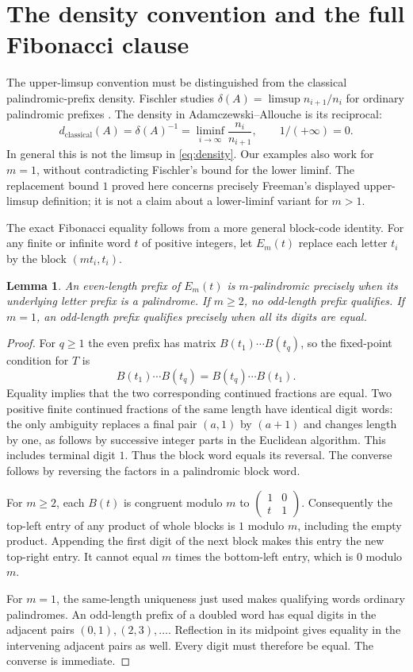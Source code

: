 \documentclass[11pt]{article}
\newtheorem{lemma}[theorem]{Lemma}
\begin{document}
\section{The density convention and the full Fibonacci clause}
The upper-limsup convention must be distinguished from the classical
palindromic-prefix density. Fischler studies
$\delta(A)=\limsup n_{i+1}/n_i$ for ordinary palindromic prefixes
\cite[\S1]{Fischler}. The density in Adamczewski--Allouche
\cite[\S5, Theorem~12]{AA} is its reciprocal:
\[
 d_{\mathrm{classical}}(A)=\delta(A)^{-1}
    =\liminf_{i\to\infty}\frac{n_i}{n_{i+1}},
 \qquad 1/(+\infty)=0.
\]
In general this is not the limsup in \eqref{eq:density}. Our examples also
work for $m=1$, without contradicting Fischler's bound for the lower liminf.
The replacement bound $1$ proved here concerns precisely Freeman's displayed
upper-limsup definition; it is not a claim about a lower-liminf variant for
$m>1$.

The exact Fibonacci equality follows from a more general block-code identity.
For any finite or infinite word $t$ of positive integers, let $E_m(t)$
replace each letter $t_i$ by the block $(mt_i,t_i)$.

\begin{lemma}\label{lem:block}
An even-length prefix of $E_m(t)$ is $m$-palindromic precisely when its
underlying letter prefix is a palindrome. If $m\geq2$, no odd-length prefix
qualifies. If $m=1$, an odd-length prefix qualifies precisely when all its
digits are equal.
\end{lemma}
\begin{proof}
For $q\geq1$ the even prefix has matrix $B(t_1)\cdots B(t_q)$, so the
fixed-point condition for $T$ is
\[
 B(t_1)\cdots B(t_q)=B(t_q)\cdots B(t_1).
\]
Equality implies that the two corresponding continued fractions are equal.
Two positive finite continued fractions of the same length have identical
digit words: the only ambiguity replaces a final pair $(a,1)$ by $(a+1)$
and changes length by one, as follows by successive integer parts in the
Euclidean algorithm. This includes terminal digit $1$.
Thus the block word equals its reversal. The converse follows by reversing
the factors in a palindromic block word.

For $m\geq2$, each $B(t)$ is congruent modulo $m$ to
$\left(\begin{smallmatrix}1&0\\t&1\end{smallmatrix}\right)$.
Consequently the top-left entry of any product of whole blocks is $1$
modulo $m$, including the empty product. Appending the first digit of the
next block makes this entry the new top-right entry. It cannot equal
$m$ times the bottom-left entry, which is $0$ modulo $m$.

For $m=1$, the same-length uniqueness just used makes qualifying words
ordinary palindromes. An odd-length prefix of a doubled word has equal
digits in the adjacent pairs $(0,1),(2,3),\ldots$. Reflection in its
midpoint gives equality in the intervening adjacent pairs as well.
Every digit must therefore be equal. The converse is immediate.
\end{proof}
\end{document}
